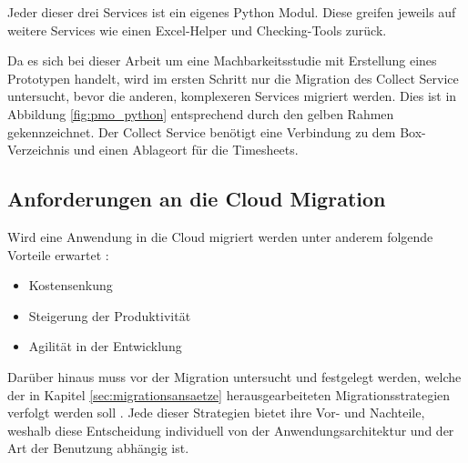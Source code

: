 Jeder dieser drei Services ist ein eigenes Python Modul. Diese greifen jeweils auf weitere Services wie einen Excel-Helper und Checking-Tools zurück.

Da es sich bei dieser Arbeit um eine Machbarkeitsstudie mit Erstellung eines Prototypen handelt, wird im ersten Schritt nur die Migration des Collect Service untersucht, bevor die anderen, komplexeren Services migriert werden. Dies ist in Abbildung \ref{fig:pmo_python} entsprechend durch den gelben Rahmen gekennzeichnet. Der Collect Service benötigt eine Verbindung zu dem \gls{Box}-Verzeichnis und einen Ablageort für die \grqq{} Timesheets.

\subsection{Anforderungen an die Cloud Migration}
Wird eine Anwendung in die Cloud migriert werden unter anderem folgende Vorteile erwartet \cite[Vgl. auch im Folgenden][03:23-05:36min]{AWS2019}:
\begin{itemize}
\item Kostensenkung
\item Steigerung der Produktivität
\item Agilität in der Entwicklung
\end{itemize}

Darüber hinaus muss vor der Migration untersucht und festgelegt werden, welche der in Kapitel \ref{sec:migrationsansaetze} herausgearbeiteten Migrationsstrategien verfolgt werden soll \cite[Vgl.][10:38-13:23min]{AWS2019}. Jede dieser Strategien bietet ihre Vor- und Nachteile, weshalb diese Entscheidung individuell von der Anwendungsarchitektur und der Art der Benutzung abhängig ist. \pagebreak


